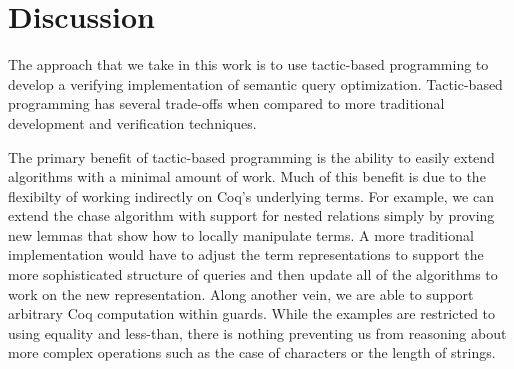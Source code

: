 \documentclass[preprint]{sigplanconf}
\newcommand{\greg}[1]{\textcolor{blue}{GREG: #1}}
\newcommand{\ltac}[0]{\ensuremath{\mathcal{L}_{\mathrm{tac}}}}
\begin{document}
%
%



\section{Discussion}
\label{sec:discussion}

The approach that we take in this work is to use tactic-based programming to develop a verifying implementation of semantic query optimization.
Tactic-based programming has several trade-offs when compared to more traditional development and verification techniques.

The primary benefit of tactic-based programming is the ability to easily extend algorithms with a minimal amount of work.
Much of this benefit is due to the flexibilty of working indirectly on Coq's underlying terms.
For example, we can extend the chase algorithm with support for nested relations simply by proving new lemmas that show how to locally manipulate terms.
A more traditional implementation would have to adjust the term representations to support the more sophisticated structure of queries and then update all of the algorithms to work on the new representation.
Along another vein, we are able to support arbitrary Coq computation within guards.
While the examples are restricted to using equality and less-than, there is nothing preventing us from reasoning about more complex operations such as the case of characters or the length of strings.
\end{document}
